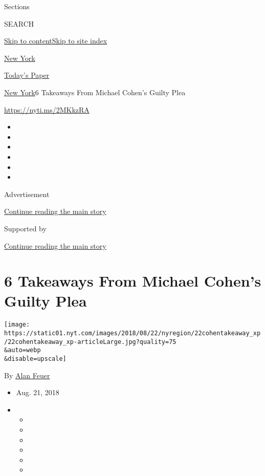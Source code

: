 Sections

SEARCH

\protect\hyperlink{site-content}{Skip to
content}\protect\hyperlink{site-index}{Skip to site index}

\href{https://www.nytimes.com/section/nyregion}{New York}

\href{https://myaccount.nytimes.com/auth/login?response_type=cookie\&client_id=vi}{}

\href{https://www.nytimes.com/section/todayspaper}{Today's Paper}

\href{/section/nyregion}{New York}\textbar{}6 Takeaways From Michael
Cohen's Guilty Plea

\url{https://nyti.ms/2MKkzRA}

\begin{itemize}
\item
\item
\item
\item
\item
\item
\end{itemize}

Advertisement

\protect\hyperlink{after-top}{Continue reading the main story}

Supported by

\protect\hyperlink{after-sponsor}{Continue reading the main story}

\hypertarget{6-takeaways-from-michael-cohens-guilty-plea}{%
\section{6 Takeaways From Michael Cohen's Guilty
Plea}\label{6-takeaways-from-michael-cohens-guilty-plea}}

\texttt{[image: https://static01.nyt.com/images/2018/08/22/nyregion/22cohentakeaway\_xp/22cohentakeaway\_xp-articleLarge.jpg?quality=75\\\&auto=webp\\\&disable=upscale]}

By \href{http://www.nytimes.com/by/alan-feuer}{Alan Feuer}

\begin{itemize}
\item
  Aug. 21, 2018
\item
  \begin{itemize}
  \item
  \item
  \item
  \item
  \item
  \item
  \end{itemize}
\end{itemize}

